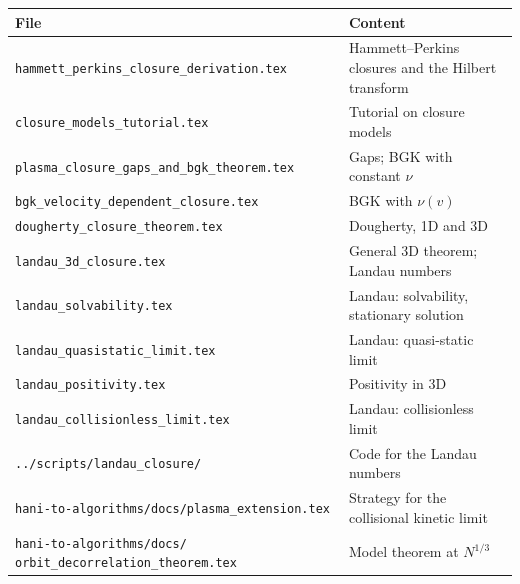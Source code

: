 \documentclass[11pt]{article}
\begin{document}
\begin{center}
\renewcommand{\arraystretch}{1.2}
\small
\begin{tabular}{>{\raggedright}p{8.6cm}p{6.6cm}}
  File & Content \\ \hline
  \texttt{hammett\_perkins\_closure\_derivation.tex} & Hammett--Perkins
    closures and the Hilbert transform \\
  \texttt{closure\_models\_tutorial.tex} & Tutorial on closure models \\
  \texttt{plasma\_closure\_gaps\_and\_bgk\_theorem.tex} & Gaps; BGK with
    constant $\nu$ \\
  \texttt{bgk\_velocity\_dependent\_closure.tex} & BGK with $\nu(v)$ \\
  \texttt{dougherty\_closure\_theorem.tex} & Dougherty, 1D and 3D \\
  \texttt{landau\_3d\_closure.tex} & General 3D theorem; Landau numbers \\
  \texttt{landau\_solvability.tex} & Landau: solvability, stationary
    solution \\
  \texttt{landau\_quasistatic\_limit.tex} & Landau: quasi-static limit \\
  \texttt{landau\_positivity.tex} & Positivity in 3D \\
  \texttt{landau\_collisionless\_limit.tex} & Landau: collisionless limit \\
  \texttt{../scripts/landau\_closure/} & Code for the Landau numbers \\
  \texttt{hani-to-algorithms/docs/plasma\_extension.tex} & Strategy for the
    collisional kinetic limit \\
  \texttt{hani-to-algorithms/docs/ orbit\_decorrelation\_theorem.tex} &
    Model theorem at $N^{1/3}$ \\
\end{tabular}
\end{center}
\end{document}
